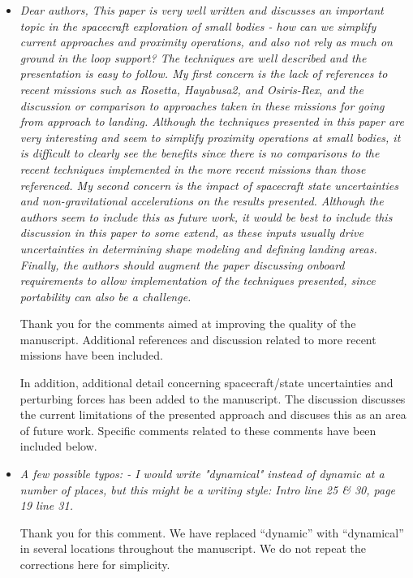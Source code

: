 \documentclass[11pt]{article}
\newcommand{\comment}[1]{\item \itshape #1 \normalfont}
\begin{document}
\begin{itemize}\setlength{\itemsep}{2\parsep}

\comment{    Dear authors,
This paper is very well written and discusses an important topic in the spacecraft exploration of small bodies - how can we simplify current approaches and proximity operations, and also not rely as much on ground in the loop support? The techniques are well described and the presentation is easy to follow.
My first concern is the lack of references to recent missions such as Rosetta, Hayabusa2, and Osiris-Rex, and the discussion or comparison to approaches taken in these missions for going from approach to landing. 
Although the techniques presented in this paper are very interesting and seem to simplify proximity operations at small bodies, it is difficult to clearly see the benefits since there is no comparisons to the recent techniques implemented in the more recent missions than those referenced.
My second concern is the impact of spacecraft state uncertainties and non-gravitational accelerations on the results presented.
Although the authors seem to include this as future work, it would be best to include this discussion in this paper to some extend, as these inputs usually drive uncertainties in determining shape modeling and defining landing areas.  
Finally, the authors should augment the paper discussing onboard requirements to allow implementation of the techniques presented, since portability can also be a challenge.

}

Thank you for the comments aimed at improving the quality of the manuscript. 
Additional references and discussion related to more recent missions have been included.

In addition, additional detail concerning spacecraft/state uncertainties and perturbing forces has been added to the manuscript.
The discussion discusses the current limitations of the presented approach and discuses this as an area of future work.
Specific comments related to these comments have been included below.

\comment{A few possible typos:
- I would write "dynamical" instead of dynamic at a number of places, but this might be a writing style: Intro line 25 \& 30, page 19 line 31.
}

Thank you for this comment. 
We have replaced ``dynamic'' with ``dynamical'' in several locations throughout the manuscript.
We do not repeat the corrections here for simplicity.



\end{itemize}
\end{document}
